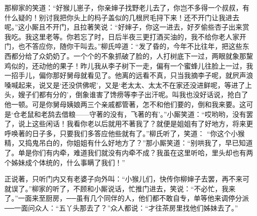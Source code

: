 \begin{parag}
    那柳家的笑道：“好猴儿崽子，你亲婶子找野老儿去了，你岂不多得一个叔叔，有什么疑的！别讨我把你头上的杩子盖似的几根屄毛挦下来！还不开门让我进去呢。”这小厮且不开门，且拉著笑说：“好婶子，你这一进去，好歹偷些杏子出来赏我吃。我这里老等。你若忘了时，日后半夜三更打酒买油的，我不给你老人家开门，也不答应你，随你干叫去。”柳氏啐道：“发了昏的，今年不比往年，把这些东西都分给了众奶奶了。一个个的不象抓破了脸的，人打树底下一过，两眼就象那黧鸡似的，还动他的果子！昨儿我从李子树下一走，偏有一个蜜蜂儿往脸上一过，我一招手儿，偏你那好舅母就看见了。他离的远看不真，只当我摘李子呢，就屄声浪嗓喊起来，说又是‘还没供佛呢’，又是‘老太太、太太不在家还没进鲜呢，等进了上头，嫂子们都有分的’，倒象谁害了馋痨等李子出汗呢。叫我也没好话说，抢白了他一顿。可是你舅母姨娘两三个亲戚都管著，怎不和他们要的，倒和我来要。这可是‘仓老鼠和老鸹去借粮——守著的没有，飞著的有’。”小厮笑道：“哎哟哟，没有罢了，说上这些闲话！我看你老以后就用不著我了？就便是姐姐有了好地方，将来更呼唤著的日子多，只要我们多答应他些就有了。”柳氏听了，笑道： “你这个小猴精，又捣鬼吊白的，你姐姐有什么好地方了？”那小厮笑道：“别哄我了，早已知道了。单是你们有内牵，难道我们就没有内牵不成？我虽在这里听哈，里头却也有两个姊妹成个体统的，什么事瞒了我们！”
\end{parag}


\begin{parag}
    正说著，只听门内又有老婆子向外叫：“小猴儿们，快传你柳婶子去罢，再不来可就误了。”柳家的听了，不顾和小厮说话，忙推门进去，笑说：“不必忙，我来了。”一面来至厨房，──虽有几个同伴的人，他们都不敢自专，单等他来调停分派──一面问众人：“五丫头那去了？”众人都说：“才往茶房里找他们姊妹去了。”
\end{parag}


